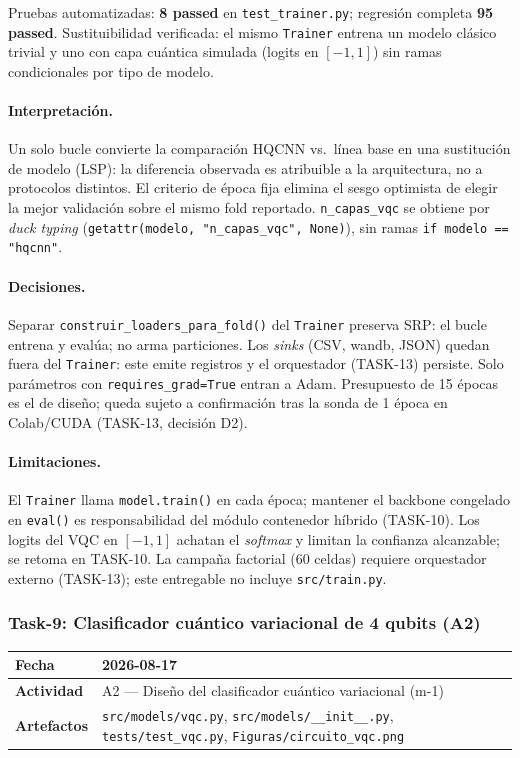 Pruebas automatizadas: \textbf{8 passed} en \texttt{test\_trainer.py}; regresión completa
\textbf{95 passed}. Sustituibilidad verificada: el mismo \texttt{Trainer} entrena un modelo
clásico trivial y uno con capa cuántica simulada (logits en $[-1,1]$) sin ramas
condicionales por tipo de modelo.

\paragraph{Interpretación.}
Un solo bucle convierte la comparación HQCNN vs.\ línea base en una sustitución de modelo
(LSP): la diferencia observada es atribuible a la arquitectura, no a protocolos distintos.
El criterio de época fija elimina el sesgo optimista de elegir la mejor validación sobre el
mismo fold reportado. \texttt{n\_capas\_vqc} se obtiene por \textit{duck typing}
(\texttt{getattr(modelo, "n\_capas\_vqc", None)}), sin ramas \texttt{if modelo == "hqcnn"}.

\paragraph{Decisiones.}
Separar \texttt{construir\_loaders\_para\_fold()} del \texttt{Trainer} preserva SRP: el
bucle entrena y evalúa; no arma particiones. Los \textit{sinks} (CSV, wandb, JSON) quedan
fuera del \texttt{Trainer}: este emite registros y el orquestador (TASK-13) persiste.
Solo parámetros con \texttt{requires\_grad=True} entran a Adam. Presupuesto de 15 épocas
es el de diseño; queda sujeto a confirmación tras la sonda de 1 época en Colab/CUDA
(TASK-13, decisión D2).

\paragraph{Limitaciones.}
El \texttt{Trainer} llama \texttt{model.train()} en cada época; mantener el backbone
congelado en \texttt{eval()} es responsabilidad del módulo contenedor híbrido (TASK-10).
Los logits del VQC en $[-1,1]$ achatan el \textit{softmax} y limitan la confianza alcanzable;
se retoma en TASK-10. La campaña factorial (60 celdas) requiere orquestador externo
(TASK-13); este entregable no incluye \texttt{src/train.py}.

\subsubsection{Task-9: Clasificador cuántico variacional de 4 qubits (A2)}
\label{hallazgo:task-9}
\begin{tabularx}{\textwidth}{|l|X|}\hline
\textbf{Fecha} & 2026-08-17 \\\hline
\textbf{Actividad} & A2 --- Diseño del clasificador cuántico variacional (m-1) \\\hline
\textbf{Artefactos} & \texttt{src/models/vqc.py}, \texttt{src/models/\_\_init\_\_.py}, \texttt{tests/test\_vqc.py}, \texttt{Figuras/circuito\_vqc.png} \\\hline
\end{tabularx}

